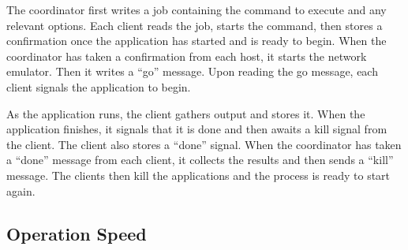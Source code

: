 \documentclass[lnicst]{svmultln}
\begin{document}
The coordinator first writes a job containing the command to execute and any relevant options. Each client reads the job, starts the command, then stores a confirmation once the application has started and is ready to begin. When the coordinator has taken a confirmation from each host, it starts the network emulator. Then it writes a ``go'' message. Upon reading the go message, each client signals the application to begin.

As the application runs, the client gathers output and stores it. When the application finishes, it signals that it is done and then awaits a kill signal from the client. The client also stores a ``done'' signal. When the coordinator has taken a ``done'' message from each client, it collects the results and then sends a ``kill'' message. The clients then kill the applications and the process is ready to start again.

\subsection{Operation Speed}
\end{document}
